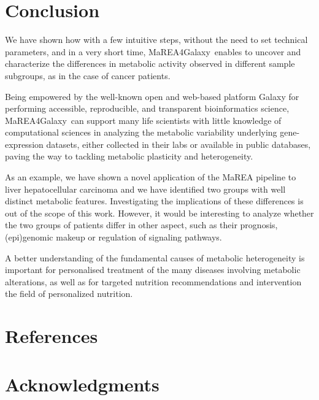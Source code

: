 \documentclass[preprint,12pt,authoryear]{elsarticle}
\newcommand{\mareagalaxy}{\textsf{MaREA4Galaxy}}
\begin{document}
\section{Conclusion}

We have shown how with a few intuitive steps, without the need to set
technical parameters, and in a very short time, \mareagalaxy\ enables
to uncover and characterize the differences in metabolic activity
observed in different sample subgroups, as in the case of cancer
patients.

Being empowered by the well-known open and web-based platform Galaxy
for performing accessible, reproducible, and transparent
bioinformatics science, \mareagalaxy\ can support many life scientists
with little knowledge of computational sciences in analyzing the
metabolic variability underlying gene-expression datasets, either
collected in their labs or available in public databases, paving the
way to tackling metabolic plasticity and heterogeneity.

As an example, we have shown a novel application of the \textsf{MaREA}
pipeline to liver hepatocellular carcinoma and we have identified two
groups with well distinct metabolic features. Investigating the
implications of these differences is out of the scope of this
work. However, it would be interesting to analyze whether the two
groups of patients differ in other aspect, such as their prognosis,
(epi)genomic makeup or regulation of signaling pathways.

A better understanding of the fundamental causes of metabolic
heterogeneity is important for personalised treatment of the many
diseases involving metabolic alterations, as well as for targeted
nutrition recommendations and intervention the field of personalized
nutrition.





\clearpage

\section*{References}

 



\section*{Acknowledgments}
\end{document}
